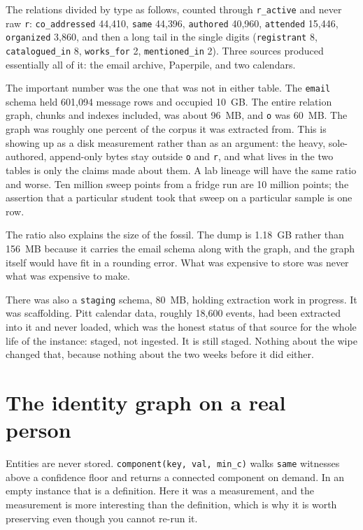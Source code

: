 The relations divided by type as follows, counted through \texttt{r\_active} and never raw \texttt{r}: \texttt{co\_addressed} 44{,}410, \texttt{same} 44{,}396, \texttt{authored} 40{,}960, \texttt{attended} 15{,}446, \texttt{organized} 3{,}860, and then a long tail in the single digits (\texttt{registrant} 8, \texttt{catalogued\_in} 8, \texttt{works\_for} 2, \texttt{mentioned\_in} 2). Three sources produced essentially all of it: the email archive, Paperpile, and two calendars.

The important number was the one that was not in either table. The \texttt{email} schema held 601{,}094 message rows and occupied 10~GB. The entire relation graph, chunks and indexes included, was about 96~MB, and \texttt{o} was 60~MB. The graph was roughly one percent of the corpus it was extracted from. This is  showing up as a disk measurement rather than as an argument: the heavy, sole-authored, append-only bytes stay outside \texttt{o} and \texttt{r}, and what lives in the two tables is only the claims made about them. A lab lineage will have the same ratio and worse. Ten million sweep points from a fridge run are 10 million points; the assertion that a particular student took that sweep on a particular sample is one row.

The ratio also explains the size of the fossil. The dump is 1.18~GB rather than 156~MB because it carries the email schema along with the graph, and the graph itself would have fit in a rounding error. What was expensive to store was never what was expensive to make.

There was also a \texttt{staging} schema, 80~MB, holding extraction work in progress. It was scaffolding. Pitt calendar data, roughly 18{,}600 events, had been extracted into it and never loaded, which was the honest status of that source for the whole life of the instance: staged, not ingested. It is still staged. Nothing about the wipe changed that, because nothing about the two weeks before it did either.

\section{The identity graph on a real person}

Entities are never stored. \texttt{component(key, val, min\_c)} walks \texttt{same} witnesses above a confidence floor and returns a connected component on demand. In an empty instance that is a definition. Here it was a measurement, and the measurement is more interesting than the definition, which is why it is worth preserving even though you cannot re-run it.

